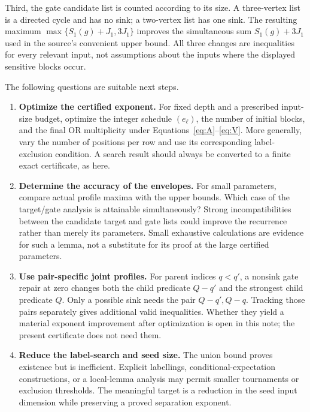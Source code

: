\documentclass[11pt]{article}
\theoremstyle{definition}
\theoremstyle{remark}
\begin{document}
Third, the gate candidate list is counted according to its size.  A
three-vertex list is a directed cycle and has no sink; a two-vertex
list has one sink.  The resulting maximum
$\max\{S_1(g)+J_1,3J_1\}$ improves the simultaneous sum
$S_1(g)+3J_1$ used in the source's convenient upper bound.  All three
changes are inequalities for every relevant input, not assumptions
about the inputs where the displayed sensitive blocks occur.

The following questions are suitable next steps.

\begin{enumerate}
\item \textbf{Optimize the certified exponent.}
For fixed depth and a prescribed input-size budget, optimize the integer
schedule $(e_\ell)$, the number of initial blocks, and the final OR
multiplicity under Equations~\eqref{eq:A}--\eqref{eq:V}.  More
generally, vary the number of positions per row and use its corresponding
label-exclusion condition.  A search result should always be converted
to a finite exact certificate, as here.

\item \textbf{Determine the accuracy of the envelopes.}
For small parameters, compare actual profile maxima with the upper
bounds.  Which case of the target/gate analysis is attainable
simultaneously?  Strong incompatibilities between the candidate target
and gate lists could improve the recurrence rather than merely its
parameters.  Small exhaustive calculations are evidence for such a
lemma, not a substitute for its proof at the large certified parameters.

\item \textbf{Use pair-specific joint profiles.}
For parent indices $q<q'$, a nonsink gate repair at zero changes both
the child predicate $Q-q'$ and the strongest child predicate $Q$.
Only a possible sink needs the pair $Q-q',Q-q$.  Tracking those pairs
separately gives additional valid inequalities.  Whether they yield a
material exponent improvement after optimization is open in this note;
the present certificate does not need them.

\item \textbf{Reduce the label-search and seed size.}
The union bound proves existence but is inefficient.  Explicit
labellings, conditional-expectation constructions, or a local-lemma
analysis may permit smaller tournaments or exclusion thresholds.
The meaningful target is a reduction in the seed input dimension while
preserving a proved separation exponent.


\end{enumerate}
\end{document}

